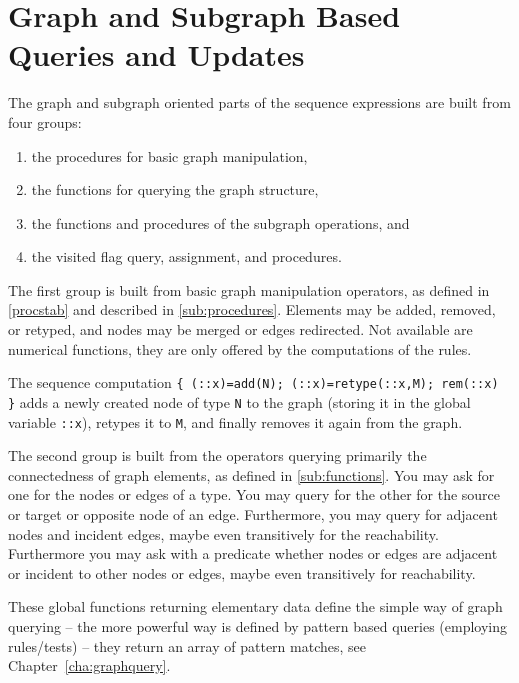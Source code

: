 \section{Graph and Subgraph Based Queries and Updates}\label{sec:queryupdate}\label{sec:visited}

The graph and subgraph oriented parts of the sequence expressions are built from four groups:
\begin{enumerate}
	\item the procedures for basic graph manipulation,
	\item the functions for querying the graph structure,
	\item the functions and procedures of the subgraph operations, and
	\item the visited flag query, assignment, and procedures.
\end{enumerate}

The first group is built from basic graph manipulation operators, as defined in \ref{procstab} and described in \ref{sub:procedures}.
Elements may be added, removed, or retyped, and nodes may be merged or edges redirected.
Not available are numerical functions, they are only offered by the computations of the rules. 

\begin{example}
The sequence computation \verb#{ (::x)=add(N); (::x)=retype(::x,M); rem(::x) }# adds a newly created node of type \texttt{N} to the graph (storing it in the global variable \verb#::x#), retypes it to \texttt{M}, and finally removes it again from the graph.
\end{example}

The second group is built from the operators querying primarily the connectedness of graph elements,
as defined in \ref{sub:functions}.
You may ask for one for the nodes or edges of a type.
You may query for the other for the source or target or opposite node of an edge.
Furthermore, you may query for adjacent nodes and incident edges,
maybe even transitively for the reachability.
Furthermore you may ask with a predicate whether nodes or edges are adjacent or incident to other nodes or edges, maybe even transitively for reachability.

These global functions returning elementary data define the simple way of graph querying -- the more powerful way is defined by pattern based queries (employing rules/tests) -- they return an array of pattern matches, see Chapter~\ref{cha:graphquery}.

